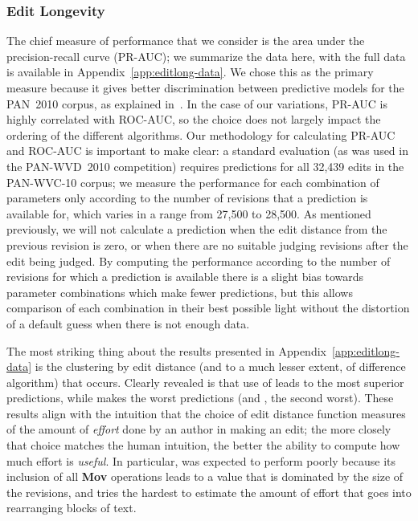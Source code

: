 \subsubsection{Edit Longevity}



The chief measure of performance that we consider is
the area under the precision-recall curve (PR-AUC);
we summarize the data here, with
the full data is available in Appendix~\ref{app:editlong-data}.
We chose this as the primary measure because it gives better
discrimination between predictive models for the PAN~2010
corpus, as explained in~\cite{Potthast2010b}.
In the case of our variations, PR-AUC is highly correlated
with ROC-AUC, so the choice does not largely impact the ordering
of the different algorithms.
Our methodology for calculating PR-AUC and ROC-AUC is important
to make clear: a standard evaluation (as was used in the
PAN-WVD~2010 competition) requires predictions for all 32,439
edits in the PAN-WVC-10 corpus; we measure the performance
for each combination of parameters only according to the number
of revisions that a prediction is available for, which varies
in a range from 27,500 to 28,500.
As mentioned previously, we will not calculate a prediction
when the edit distance from the previous revision is zero,
or when there are no suitable judging revisions after the
edit being judged.
By computing the performance according to the number of revisions
for which a prediction is available there is a slight bias towards
parameter combinations which make fewer predictions,
but this allows comparison of each combination in their best
possible light without the distortion of a default guess when
there is not enough data.

The most striking thing about the results presented
in Appendix~\ref{app:editlong-data} is the clustering
by edit distance (and to a much lesser extent, of difference
algorithm) that occurs.
Clearly revealed is that use of  leads to the most superior
predictions, while  makes the worst predictions
(and , the second worst).
These results align with the intuition that the choice
of edit distance function measures of the amount
of \textit{effort} done by an author in making an edit;
the more closely that choice matches the human intuition,
the better the ability to compute how much effort is \textit{useful}.
In particular,  was expected to perform poorly
because its inclusion of all \textbf{Mov} operations leads
to a value that is dominated by the size of the revisions,
and  tries the hardest to estimate the amount of
effort that goes into rearranging blocks of text.

